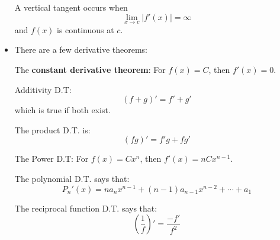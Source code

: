 \begin{itemize}
\begin{center}
    \end{center}
    \begin{definition}
        A vertical tangent occurs when
        \begin{equation}
            \lim_{x\to c}|f'(x)| = \infty
            \label{eq:}
        \end{equation}
        and $f(x)$ is continuous at $c$.
    \end{definition}
    \item There are a few derivative theorems:
    \begin{theorem}
        The \textbf{constant derivative theorem}: For $f(x)=C$, then $f'(x)=0$.
    \end{theorem}
    \begin{theorem}
        Additivity D.T:
        \begin{equation}
            (f+g)'=f'+g'
            \label{eq:}
        \end{equation}
        which is true if both exist.
    \end{theorem}
    \begin{theorem}
        The product D.T. is:
        \begin{equation}
            (fg)'=f'g+fg'
            \label{eq:}
        \end{equation}
    \end{theorem}
    \begin{theorem}
        The Power D.T: For $f(x)=Cx^n$, then $f'(x)=nCx^{n-1}$.
    \end{theorem}
    \begin{theorem}
        The polynomial D.T. says that:
        \begin{equation}
            P_n'(x)=na_nx^{n-1}+(n-1)a_{n-1}x^{n-2}+\cdots + a_1
            \label{eq:}
        \end{equation}
    \end{theorem}
    \begin{theorem}
        The reciprocal function D.T. says that:
        \begin{equation}
            \left(\frac{1}{f}\right)'=\frac{-f'}{f^2}
            \label{eq:}
        \end{equation}
    \end{theorem}

\end{itemize}
